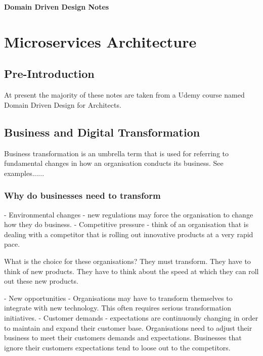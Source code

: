 \documentclass[a4paper, 11pt]{book}
\begin{document}
    \begin{titlepage}
        \centering
        \vspace*{2in}
        \Huge \textbf{Domain Driven Design Notes}
    \end{titlepage}

    \setcounter{section}{0}

    \newpage

    \tableofcontents
    \newpage

    \listoffigures
    \newpage


    \chapter{Microservices Architecture}


    \section{Pre-Introduction}
    At present the majority of these notes are taken from a Udemy course named Domain Driven Design for Architects.


    \section{Business and Digital Transformation}
    Business transformation is an umbrella term that is used for referring to fundamental changes in how an organisation conducts its business.
    See examples......

    \subsection{Why do businesses need to transform}
    - Environmental changes - new regulations may force the organisation to change how they do business.
    - Competitive pressure - think of an organisation that is dealing with a competitor that is rolling out innovative products at a very rapid pace.

    What is the choice for these organisations?
    They must transform.
    They have to think of new products.
    They have to think about the speed at which they can roll out these new products.

    - New opportunities - Organisations may have to transform themselves to integrate with new technology.
    This often requires serious transformation initiatives.
    - Customer demands - expectations are continuously changing in order to maintain and expand their customer base.
    Organisations need to adjust their business to meet their customers demands and expectations.
    Businesses that ignore their customers expectations tend to loose out to the competitors.
\end{document}

